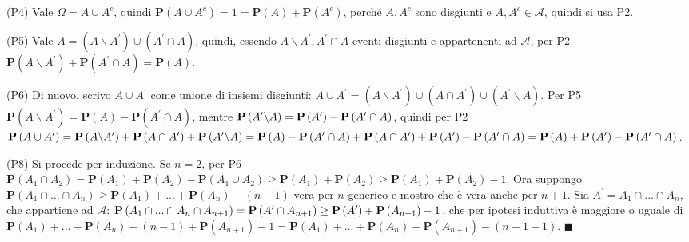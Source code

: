 \documentclass{article}
\begin{document}
(P4) Vale $\Omega =A\cup A^{c}$, quindi $\mathbf{P}\left( A\cup A^{c}\right)
=1=\mathbf{P}\left( A\right) +\mathbf{P}\left( A^{c}\right) $, perch\'{e} $%
A,A^{c}$ sono disgiunti e $A,A^{c}\in \mathcal{A}$, quindi si usa P2.

(P5) Vale $A=\left( A\backslash A^{\prime }\right) \cup \left( A^{\prime
}\cap A\right) $, quindi, essendo $A\backslash A^{\prime },A^{\prime }\cap A$
eventi disgiunti e appartenenti ad $\mathcal{A}$, per P2 $\mathbf{P}\left(
A\backslash A^{\prime }\right) +\mathbf{P}\left( A^{\prime }\cap A\right) =%
\mathbf{P}\left( A\right) $.

(P6) Di nuovo, scrivo $A\cup A^{\prime }$ come unione di insiemi disgiunti: $%
A\cup A^{\prime }=\left( A\backslash A^{\prime }\right) \cup \left( A\cap
A^{\prime }\right) \cup \left( A^{\prime }\backslash A\right) $. Per P5 $%
\mathbf{P}\left( A\backslash A^{\prime }\right) =\mathbf{P}\left( A\right) -%
\mathbf{P}\left( A^{\prime }\cap A\right) $, mentre $\mathbf{P}\left(
A^{\prime }\backslash A\right) =\mathbf{P}\left( A^{\prime }\right) -\mathbf{%
P}\left( A^{\prime }\cap A\right) $, quindi per P2 $\mathbf{P}\left( A\cup
A^{\prime }\right) =\mathbf{P}\left( A\backslash A^{\prime }\right) +\mathbf{%
P}\left( A\cap A^{\prime }\right) +\mathbf{P}\left( A^{\prime }\backslash
A\right) =\mathbf{P}\left( A\right) -\mathbf{P}\left( A^{\prime }\cap
A\right) +\mathbf{P}\left( A\cap A^{\prime }\right) +\mathbf{P}\left(
A^{\prime }\right) -\mathbf{P}\left( A^{\prime }\cap A\right) =\mathbf{P}%
\left( A\right) +\mathbf{P}\left( A^{\prime }\right) -\mathbf{P}\left(
A^{\prime }\cap A\right) $.

(P8) Si procede per induzione. Se $n=2$, per P6 $\mathbf{P}\left( A_{1}\cap
A_{2}\right) =\mathbf{P}\left( A_{1}\right) +\mathbf{P}\left( A_{2}\right) -%
\mathbf{P}\left( A_{1}\cup A_{2}\right) \geq \mathbf{P}\left( A_{1}\right) +%
\mathbf{P}\left( A_{2}\right) \geq \mathbf{P}\left( A_{1}\right) +\mathbf{P}%
\left( A_{2}\right) -1$. Ora suppongo $\mathbf{P}\left( A_{1}\cap ...\cap
A_{n}\right) \geq \mathbf{P}\left( A_{1}\right) +...+\mathbf{P}\left(
A_{n}\right) -\left( n-1\right) $ vera per $n$ generico e mostro che \`{e}
vera anche per $n+1$. Sia $A^{\prime }=A_{1}\cap ...\cap A_{n}$, che
appartiene ad $\mathcal{A}$: $\mathbf{P}\left( A_{1}\cap ...\cap A_{n}\cap
A_{n+1}\right) =\mathbf{P}\left( A^{\prime }\cap A_{n+1}\right) \geq \mathbf{%
P}\left( A^{\prime }\right) +\mathbf{P}\left( A_{n+1}\right) -1$, che per
ipotesi induttiva \`{e} maggiore o uguale di $\mathbf{P}\left( A_{1}\right)
+...+\mathbf{P}\left( A_{n}\right) -\left( n-1\right) +\mathbf{P}\left(
A_{n+1}\right) -1=\mathbf{P}\left( A_{1}\right) +...+\mathbf{P}\left(
A_{n}\right) +\mathbf{P}\left( A_{n+1}\right) -\left( n+1-1\right) $. $%
\blacksquare $
\end{document}
